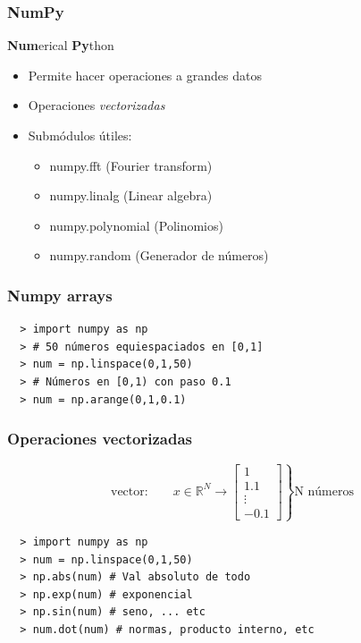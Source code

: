 \documentclass[14pt,aspectratio=169,xcolor=dvipsnames]{beamer}
\begin{document}
\begin{frame}\frametitle{NumPy}
    \textbf{Num}erical \textbf{Py}thon
    
    \begin{itemize}
        \item Permite hacer operaciones a grandes datos
        \item Operaciones \emph{vectorizadas}
        \item Submódulos útiles: 
            \begin{itemize}
                \item numpy.fft (Fourier transform)
                \item numpy.linalg (Linear algebra)
                \item numpy.polynomial (Polinomios)
                \item numpy.random (Generador de números)
            \end{itemize}
    \end{itemize}
\end{frame}
\begin{frame}[fragile]\frametitle{Numpy arrays}
    \begin{verbatim}
  > import numpy as np
  > # 50 números equiespaciados en [0,1]
  > num = np.linspace(0,1,50)
  > # Números en [0,1) con paso 0.1
  > num = np.arange(0,1,0.1)
    \end{verbatim}

\pause {}
\end{frame}
\begin{frame}[fragile]\frametitle{Operaciones vectorizadas}
    $$ \text{vector:} \qquad x\in \mathbb{R}^N \to \left.\begin{bmatrix} 1\\1.1\\\vdots \\ -0.1\end{bmatrix}\right\}\text{N números} $$

    \begin{verbatim}
  > import numpy as np
  > num = np.linspace(0,1,50)
  > np.abs(num) # Val absoluto de todo
  > np.exp(num) # exponencial
  > np.sin(num) # seno, ... etc
  > num.dot(num) # normas, producto interno, etc
    \end{verbatim}

\end{frame}
\end{document}
